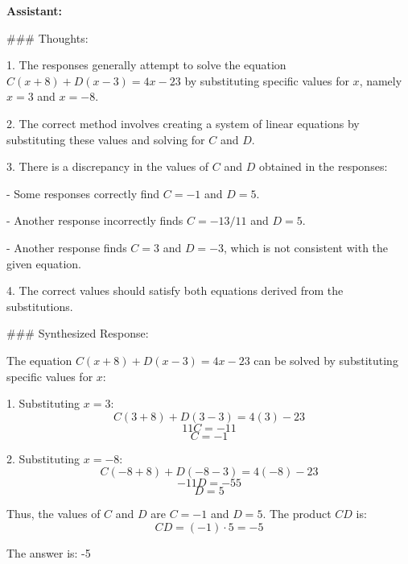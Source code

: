 \begin{center}
	\small
	\begin{tcolorbox}[width=1\linewidth,title={\textbf{An Example ICL Demonstration of MATH-500 for Aggregators: Assistant Response}}]

\textbf{Assistant:}

\#\#\# Thoughts:

1. The responses generally attempt to solve the equation \(C(x + 8) + D(x - 3) = 4x - 23\) by substituting specific values for \(x\), namely \(x = 3\) and \(x = -8\).

2. The correct method involves creating a system of linear equations by substituting these values and solving for \(C\) and \(D\).

3. There is a discrepancy in the values of \(C\) and \(D\) obtained in the responses:

   - Some responses correctly find \(C = -1\) and \(D = 5\).
   
   - Another response incorrectly finds \(C = -13/11\) and \(D = 5\).
   
   - Another response finds \(C = 3\) and \(D = -3\), which is not consistent with the given equation.

4. The correct values should satisfy both equations derived from the substitutions.

\#\#\# Synthesized Response:
 
 The equation \(C(x + 8) + D(x - 3) = 4x - 23\) can be solved by substituting specific values for \(x\):

1. Substituting \(x = 3\):
\[C(3 + 8) + D(3 - 3) = 4(3) - 23\]
\[11C = -11 \]
\[C = -1\]

2. Substituting \(x = -8\):
\[C(-8 + 8) + D(-8 - 3) = 4(-8) - 23\]
\[-11D = -55 \]
\[D = 5\]

Thus, the values of \(C\) and \(D\) are \(C = -1\) and \(D = 5\). The product \(CD\) is:
\[CD = (-1) \cdot 5 = -5\]

The answer is: -5

	\end{tcolorbox}
\end{center}




\newpage





